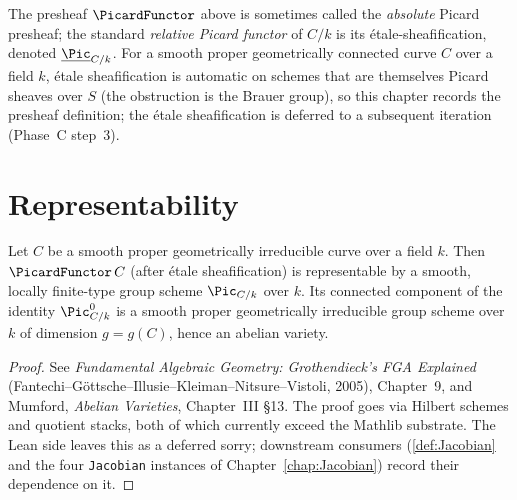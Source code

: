 \begin{remark}
  The presheaf $\PicardFunctor$ above is sometimes called the \emph{absolute} Picard presheaf; the standard \emph{relative Picard functor} of $C/k$ is its étale-sheafification, denoted $\underline{\Pic}_{C/k}$. For a smooth proper geometrically connected curve $C$ over a field $k$, étale sheafification is automatic on schemes that are themselves Picard sheaves over $S$ (the obstruction is the Brauer group), so this chapter records the presheaf definition; the étale sheafification is deferred to a subsequent iteration (Phase~C step~3).
\end{remark}

\section{Representability}

\begin{theorem}
  \label{thm:Pic_representable}
  \leanok
  Let $C$ be a smooth proper geometrically irreducible curve over a field $k$. Then $\PicardFunctor\, C$ (after étale sheafification) is representable by a smooth, locally finite-type group scheme $\Pic_{C/k}$ over $k$. Its connected component of the identity $\Pic^0_{C/k}$ is a smooth proper geometrically irreducible group scheme over $k$ of dimension $g = g(C)$, hence an abelian variety.
\end{theorem}

\begin{proof}
  See \emph{Fundamental Algebraic Geometry: Grothendieck's FGA Explained} (Fantechi--Göttsche--Illusie--Kleiman--Nitsure--Vistoli, 2005), Chapter~9, and Mumford, \emph{Abelian Varieties}, Chapter~III §13. The proof goes via Hilbert schemes and quotient stacks, both of which currently exceed the Mathlib substrate. The Lean side leaves this as a deferred sorry; downstream consumers (\ref{def:Jacobian} and the four \lstinline{Jacobian} instances of Chapter~\ref{chap:Jacobian}) record their dependence on it.
\end{proof}

